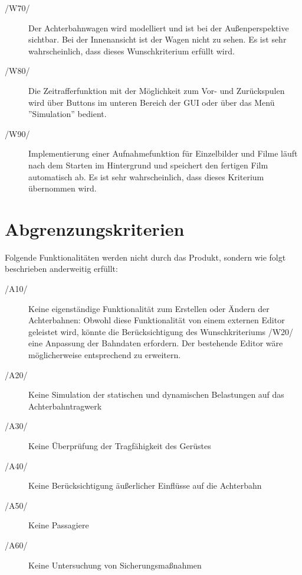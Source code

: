 \begin{description}
	\item[/W70/] Der Achterbahnwagen wird modelliert und ist bei der Außenperspektive sichtbar. Bei der Innenansicht ist der Wagen nicht zu sehen. Es ist sehr wahrscheinlich, dass dieses Wunschkriterium erfüllt wird.
	\item[/W80/] Die Zeitrafferfunktion mit der Möglichkeit zum Vor- und Zurückspulen wird über Buttons im unteren Bereich der GUI oder über das Menü ''Simulation'' bedient.
	\item[/W90/] Implementierung einer Aufnahmefunktion für Einzelbilder und Filme läuft nach dem Starten im Hintergrund und speichert den fertigen Film automatisch ab. Es ist sehr wahrscheinlich, dass dieses Kriterium übernommen wird.
\end{description}

\section{Abgrenzungskriterien}
Folgende Funktionalitäten werden nicht durch das Produkt, sondern wie folgt
beschrieben anderweitig erfüllt:
\begin{description}
	\item[/A10/] Keine eigenständige Funktionalität zum Erstellen oder Ändern der Achterbahnen: Obwohl diese Funktionalität von einem externen Editor geleistet wird, könnte die Berücksichtigung
		     des Wunschkriteriums /W20/ eine Anpassung der Bahndaten erfordern. Der bestehende Editor wäre möglicherweise entsprechend zu erweitern.
	\item[/A20/] Keine Simulation der statischen und dynamischen Belastungen auf das Achterbahntragwerk
	\item[/A30/] Keine Überprüfung der Tragfähigkeit des Gerüstes
	\item[/A40/] Keine Berücksichtigung äußerlicher Einflüsse auf die Achterbahn
	\item[/A50/] Keine Passagiere
	\item[/A60/] Keine Untersuchung von Sicherungsmaßnahmen
\end{description}
